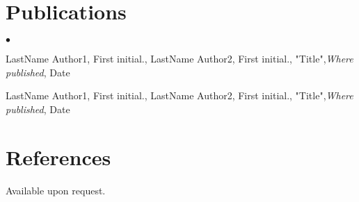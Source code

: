 \documentclass[margin,line]{res}
\newenvironment{list2}{
  \begin{list}{$\bullet$}{%
      \setlength{\itemsep}{0in}
      \setlength{\parsep}{0in} \setlength{\parskip}{0in}
      \setlength{\topsep}{0in} \setlength{\partopsep}{0in}
      \setlength{\leftmargin}{0.2in}}}{\end{list}}
\begin{document}
\begin{resume}
\section{\sc Publications}

\begin{list2}
\item LastName Author1, First initial., LastName Author2, First initial.,  "Title",{\em Where published}, Date
\item LastName Author1, First initial., LastName Author2, First initial.,  "Title",{\em Where published}, Date
\end{list2}


\section{\sc References }
Available upon request.

\end{resume}
\end{document}
